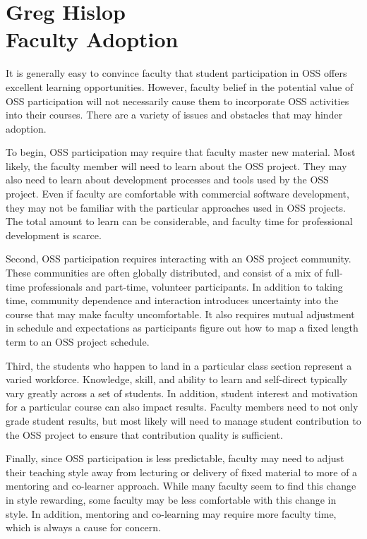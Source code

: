 \documentclass{sig-alternate}
\begin{document}
\section{Greg Hislop\\Faculty Adoption}        
It is generally easy to convince faculty that student participation in OSS offers excellent learning opportunities.  However, faculty belief in the potential value of OSS participation will not necessarily cause them to incorporate OSS activities into their courses.  There are a variety of issues and obstacles that may hinder adoption.

To begin, OSS participation may require that faculty master new material.  Most likely, the faculty member will need to learn about the OSS project.  They may also need to learn about development processes and tools used by the OSS project.  Even if faculty are comfortable with commercial software development, they may not be familiar with the particular approaches used in OSS projects.  The total amount to learn can be considerable, and faculty time for professional development is scarce.

Second, OSS participation requires interacting with an OSS project community.  These communities are often globally distributed, and consist of a mix of full-time professionals and part-time, volunteer participants.  In addition to taking time, community dependence and interaction introduces uncertainty into the course that may make faculty uncomfortable.  It also requires mutual adjustment in schedule and expectations as participants figure out how to map a fixed length term to an OSS project schedule.

Third, the students who happen to land in a particular class section represent a varied workforce.  Knowledge, skill, and ability to learn and self-direct typically vary greatly across a set of students. In addition, student interest and motivation for a particular course can also impact results.  Faculty members need to not only grade student results, but most likely will need to manage student contribution to the OSS project to ensure that contribution quality is sufficient.

Finally, since OSS participation is less predictable, faculty may need to adjust their teaching style away from lecturing or delivery of fixed material to more of a mentoring and co-learner approach.  While many faculty seem to find this change in style rewarding, some faculty may be less comfortable with this change in style.  In addition, mentoring and co-learning may require more faculty time, which is always a cause for concern.
    
\end{document}
